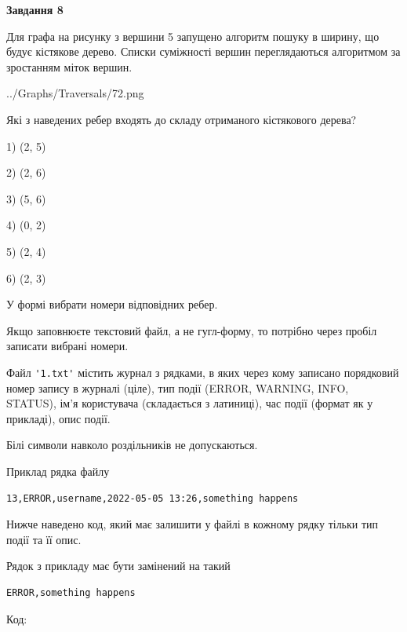 \documentclass[12pt, ukrainian]{article}
\def\code#1{\Verb!#1!}
\begin{document}
{\begin {large}
{\begin {center}\textbf{Завдання 8}\end {center}}\par
Для графа на рисунку з вершини 5 запущено алгоритм пошуку в ширину, що будує кістякове дерево. Списки суміжності вершин переглядаються алгоритмом за зростанням міток вершин.\par
\begin{center}
	{../Graphs/Traversals/72.png}
\end{center}
\par Які з наведених ребер входять до складу отриманого кістякового дерева?\par
1) (2, 5)\par
2) (2, 6)\par
3) (5, 6)\par
4) (0, 2)\par
5) (2, 4)\par
6) (2, 3)\par
{\vskip 15pt} У формі вибрати номери відповідних ребер.


Якщо заповнюєте текстовий файл, а не гугл-форму, то потрібно через пробіл записа\-ти вибрані номери.\par
\newpage


Файл \code{'1.txt'} містить журнал з рядками, в яких через кому записано поряд\-ко\-вий номер запису в журналі (ціле), тип події (ERROR, WARNING, INFO, STATUS), ім'я користувача (складається з латиниці), час події (фор\-мат як у прикладі), опис події.

Білі символи навколо роздільників не допускаються.

Приклад рядка файлу



\begin{verbatim}
13,ERROR,username,2022-05-05 13:26,something happens
\end{verbatim}


Нижче наведено код, який має залишити у файлі в кожному рядку тільки тип події та її опис.

Рядок з прикладу має бути замінений на такий



\begin{verbatim}
ERROR,something happens
\end{verbatim}




Код:




\end{large}}
\end{document}
